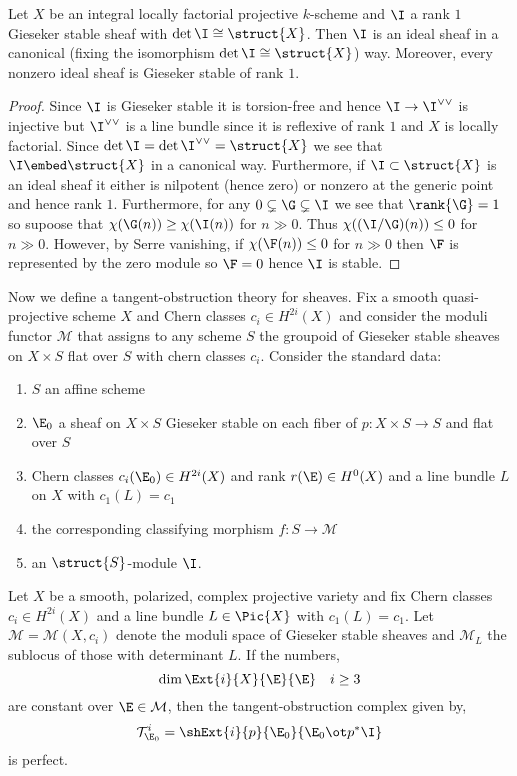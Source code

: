 \documentclass[12pt]{article}
\newcommand{\cM}{\mathcal{M}}
\newcommand{\cT}{\mathcal{T}}
\begin{document}
\begin{prop}
Let $X$ be an integral locally factorial projective $k$-scheme and $\I$ a rank $1$ Gieseker stable sheaf with $\det{\I} \cong \struct{X}$. Then $\I$ is an ideal sheaf in a canonical (fixing the isomorphism $\det{\I} \cong \struct{X}$) way. Moreover, every nonzero ideal sheaf is Gieseker stable of rank $1$.
\end{prop}

\begin{proof}
Since $\I$ is Gieseker stable it is torsion-free and hence $\I \to \I^{\vee \vee}$ is injective but $\I^{\vee \vee}$ is a line bundle since it is reflexive of rank $1$ and $X$ is locally factorial. Since $\det{\I} = \det{\I^{\vee \vee}} = \struct{X}$ we see that $\I \embed \struct{X}$ in a canonical way. Furthermore, if $\I \subset \struct{X}$ is an ideal sheaf it either is nilpotent (hence zero) or nonzero at the generic point and hence rank $1$. Furthermore, for any $0 \subsetneq \G \subsetneq \I$ we see that $\rank{\G} = 1$ so supoose that $\chi(\G(n)) \ge \chi(\I(n))$ for $n \gg 0$. Thus $\chi((\I / \G)(n)) \le 0$ for $n \gg 0$. However, by Serre vanishing, if $\chi(\F(n)) \le 0$ for $n \gg 0$ then $\F$ is represented by the zero module so $\F = 0$ hence $\I$ is stable.
\end{proof}


Now we define a tangent-obstruction theory for sheaves. Fix a smooth quasi-projective scheme $X$ and Chern classes $c_i \in H^{2i}(X)$ and consider the moduli functor $\cM$ that assigns to any scheme $S$ the groupoid of Gieseker stable sheaves on $X \times S$ flat over $S$ with chern classes $c_i$. Consider the standard data:

\begin{enumerate}
\item $S$ an affine scheme
\item $\E_0$ a sheaf on $X \times S$ Gieseker stable on each fiber of $p : X \times S \to S$ and flat over $S$
\item Chern classes $c_i(\E_0) \in H^{2i}(X)$ and rank $r(\E) \in H^0(X)$ and a line bundle $L$ on $X$ with $c_1(L) = c_1$
\item the corresponding classifying morphism $f : S \to \cM$
\item an $\struct{S}$-module $\I$.
\end{enumerate}

\begin{theorem}
Let $X$ be a smooth, polarized, complex projective variety and fix Chern classes $c_i \in H^{2i}(X)$ and a line bundle $L \in \Pic{X}$ with $c_1(L) = c_1$. Let $\cM = \cM(X, c_i)$ denote the moduli space of Gieseker stable sheaves and $\cM_L$ the sublocus of those with determinant $L$. If the numbers,
\[ \dim{\Ext{i}{X}{\E}{\E}} \quad i \ge 3 \]
are constant over $\E \in \cM$, then the tangent-obstruction complex given by,
\[ \cT^i_{\E_0} = \shExt{i}{p}{\E_0}{\E_0 \ot p^* \I} \]
is perfect.
\end{theorem}
\end{document}
